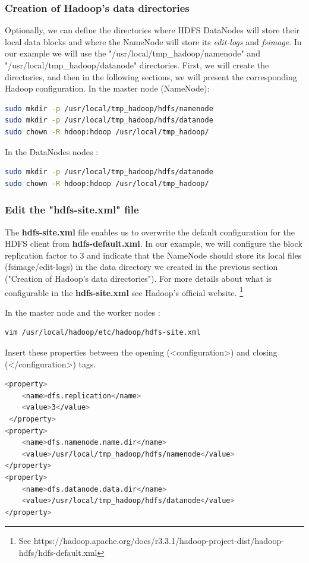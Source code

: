 \documentclass[12pt,english]{book}
\begin{document}
\subsubsection{Creation of Hadoop's data directories}

Optionally, we can define the directories where HDFS DataNodes will store their local data blocks and where the NameNode will store its \textit{edit-logs} and \textit{fsimage}.
In our example we will use the "/usr/local/tmp\_hadoop/namenode" and "/usr/local/tmp\_hadoop/datanode" directories.
First, we will create the directories, and then in the following sections, we will present the corresponding Hadoop configuration. 
In the master node (NameNode):
\begin{lstlisting}[language=bash, frame=single]
sudo mkdir -p /usr/local/tmp_hadoop/hdfs/namenode
sudo mkdir -p /usr/local/tmp_hadoop/hdfs/datanode
sudo chown -R hdoop:hdoop /usr/local/tmp_hadoop/
\end{lstlisting}
In the DataNodes nodes :
\begin{lstlisting}[language=bash, frame=single]
sudo mkdir -p /usr/local/tmp_hadoop/hdfs/datanode
sudo chown -R hdoop:hdoop /usr/local/tmp_hadoop/
\end{lstlisting}


\subsubsection{Edit the "hdfs-site.xml" file}


The \textbf{hdfs-site.xml} file enables us to overwrite the default configuration for the HDFS client from \textbf{hdfs-default.xml}.
In our example, we will configure the block replication factor to 3 and indicate that the NameNode should store its local files (fsimage/edit-logs) in the data directory we created in the previous section ("Creation of Hadoop's data directories").
For more details about what is configurable in the \textbf{hdfs-site.xml} see Hadoop's official website.
\footnote{See https://hadoop.apache.org/docs/r3.3.1/hadoop-project-dist/hadoop-hdfs/hdfs-default.xml}

In the master node and the worker nodes :
\begin{lstlisting}[language=bash, frame=single]
vim /usr/local/hadoop/etc/hadoop/hdfs-site.xml 
\end{lstlisting}
Insert these properties between the opening (<configuration>) and closing (</configuration>) tags.
\begin{lstlisting}[language=bash, frame=single]
<property>
	<name>dfs.replication</name>
	<value>3</value>
 </property>
<property>
	<name>dfs.namenode.name.dir</name>
	<value>/usr/local/tmp_hadoop/hdfs/namenode</value>
</property>
<property>
	<name>dfs.datanode.data.dir</name>
	<value>/usr/local/tmp_hadoop/hdfs/datanode</value>
</property>
\end{lstlisting}
\end{document}
